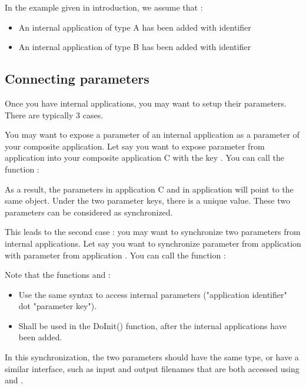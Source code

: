 In the example given in introduction, we assume that :
\begin{itemize}
\item An internal application of type A has been added with identifier 
\item An internal application of type B has been added with identifier 
\end{itemize}

\subsection{Connecting parameters}

Once you have internal applications, you may want to setup their parameters. There
are typically 3 cases.

You may want to expose a parameter of an internal application as a parameter of
your composite application. Let say you want to expose parameter  from application
 into your composite application C with the key . You can call the function :


As a result, the parameters  in application C and  in application 
will point to the same object. Under the two parameter keys, there is a unique value.
These two parameters can be considered as synchronized.

This leads to the second case : you may want to synchronize two parameters from internal
applications. Let say you want to synchronize parameter  from application
 with parameter  from application . You can call the function :


Note that the functions  and  :
\begin{itemize}
\item Use the same syntax to access internal parameters ("application identifier"
dot "parameter key").
\item Shall be used in the DoInit() function, after the internal applications
have been added.
\end{itemize}

In this synchronization, the two parameters should have the same type, or have a
similar interface, such as input and output filenames that are both accessed using
 and .

